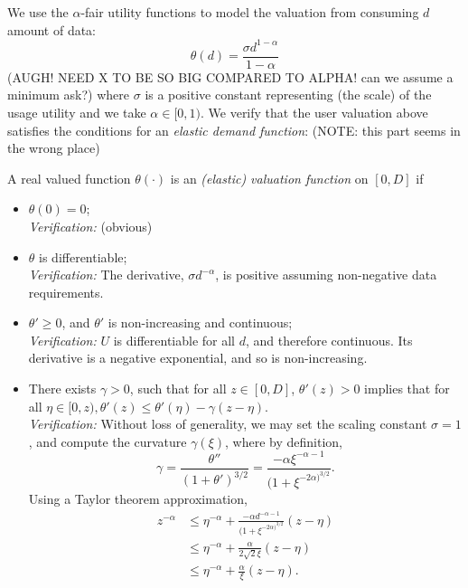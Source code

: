 \documentclass[12pt]{article}
\theoremstyle{definition}
\begin{document}
\begin{multicols}{2}
\iffalse 
We use the $\alpha$-fair utility functions \cite{zheng} to model the
valuation from consuming $d$ amount of data:
\begin{equation}\label{buyervaluation}
    \theta(d) = \frac{\sigma d^{1-\alpha}}{1-\alpha}
\end{equation}
(AUGH! NEED X TO BE SO BIG COMPARED TO ALPHA! can we assume a minimum ask?)
where $\sigma$ is a positive constant representing (the scale) of the usage
utility and we take $\alpha \in [0, 1)$.
We verify that the user valuation above satisfies the conditions for an
\emph{elastic demand function}: (NOTE: this part seems in the wrong place)

A real valued function $\theta(\cdot)$ is an \emph{(elastic) valuation
function} on $[0, D]$ if 
\begin{itemize}
    \item $\theta(0) = 0$; \\
        \emph{Verification:} (obvious)
    \item $\theta$ is differentiable; \\
        \emph{Verification:} The derivative, $\sigma d^{-\alpha}$, is positive assuming non-negative
data requirements.
    \item $\theta ' \ge 0$, and $\theta '$ is non-increasing and continuous; \\
        \emph{Verification:} $U$ is differentiable for all $d$, and therefore
continuous. Its derivative is a negative exponential, and so is non-increasing.
    \item There exists $\gamma > 0$, such that for all $z \in [0,D]$, $\theta
'(z) > 0$ implies that for all $\eta \in [0, z), \theta '(z) \le \theta '(\eta)
- \gamma(z - \eta)$. \\
        \emph{Verification:} Without loss of generality, we may set the scaling
constant $\sigma=1$, and compute the curvature $\gamma(\xi)$, where by definition,
$$
    \gamma = \frac{\theta''}{(1+\theta')^{3/2}} = \frac{-\alpha
\xi^{-\alpha-1}}{(1+\xi^{-2\alpha)^{3/2}}}.
$$
Using a Taylor theorem approximation,
\begin{align*}
    z^{-\alpha} &\le \eta^{-\alpha} + \frac{-\alpha
d^{-\alpha-1}}{(1+\xi^{-2\alpha)^{3/2}}}(z-\eta) \\
    & \le \eta^{-\alpha} +
\frac{\alpha}{2\sqrt{2} \xi}(z-\eta)  \\
    &\le \eta^{-\alpha} +
\frac{\alpha}{\xi}(z-\eta).
\end{align*}

\end{itemize}
\end{multicols}
\end{document}
